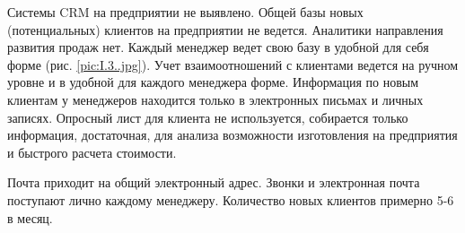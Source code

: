 Системы CRM на предприятии не выявлено. Общей базы новых (потенциальных) клиентов на предприятии не ведется. Аналитики направления развития продаж нет. Каждый менеджер ведет свою базу в удобной для себя форме (рис. \ref{pic:I.3..jpg}). Учет взаимоотношений с клиентами ведется на ручном уровне и в удобной для каждого менеджера форме. Информация по новым клиентам у менеджеров находится только в электронных письмах и личных записях. Опросный лист для клиента не используется, собирается только информация, достаточная, для анализа возможности изготовления на предприятия и быстрого расчета стоимости.   

Почта приходит на общий электронный адрес. 
Звонки и электронная почта поступают лично каждому менеджеру.
Количество новых клиентов примерно 5-6 в месяц.



 








